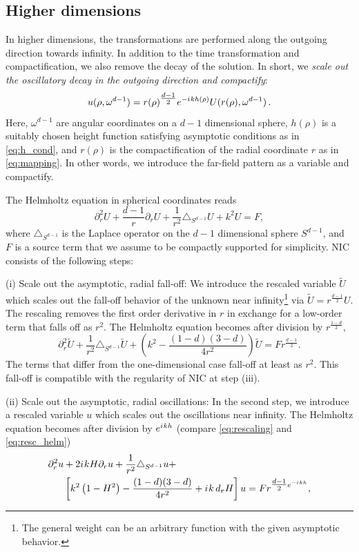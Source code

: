 \documentclass[onefignum,onetabnum]{siamart190516}
\newcommand{\be}{\begin{equation}}
\newcommand{\ee}{\end{equation}}
\newcommand{\iu}{{i\mkern1mu}}
\begin{document}
\subsection{Higher dimensions}\label{sec:high_d}
In higher dimensions, the transformations are performed along the outgoing direction towards infinity. In addition to the time transformation and compactification, we also remove the decay of the solution. In short, we \emph{scale out the oscillatory decay in the outgoing direction and compactify}:
\be\label{eq:summary} u(\rho, \omega^{d-1}) = r(\rho)^{\tfrac{d-1}{2}} e^{-\iu k h(\rho)} U(r(\rho), \omega^{d-1})\,.\ee
Here, $\omega^{d-1}$ are angular coordinates on a $d-1$ dimensional sphere, $h(\rho)$ is a suitably chosen height function satisfying asymptotic conditions as in \eqref{eq:h_cond}, and $r(\rho)$ is the compactification of the radial coordinate $r$ as in \eqref{eq:mapping}. In other words, we introduce the far-field pattern as a variable and compactify.

The Helmholtz equation in spherical coordinates reads
\begin{equation}\label{eq:helm_sph}
	\partial_r^2 U + \frac{d-1}{r} \partial_r U + \frac{1}{r^2}\triangle_{S^{d-1}} U + k^2 U = F,
\end{equation}
where $\triangle_{S^{d-1}}$ is the Laplace operator on the $d-1$ dimensional sphere $S^{d-1}$, and $F$ is a source term that we assume to be compactly supported for simplicity. NIC consists of the following steps:

\noindent (i) Scale out the asymptotic, radial fall-off: We introduce the rescaled variable $\tilde{U}$ which scales out the fall-off behavior of the unknown near infinity\footnote{The general weight can be an arbitrary function with the given asymptotic behavior.} via $\tilde{U} = r^{\tfrac{d-1}{2}} U$. The rescaling removes the first order derivative in $r$ in exchange for a low-order term that falls off as $r^2$. The Helmholtz equation becomes after division by $r^{\tfrac{1-d}{2}}$,
\[ \partial_r^2 \tilde{U} + \frac{1}{r^2}\triangle_{S^{d-1}} \tilde{U} + \left(k^2 - \frac{(1-d)(3-d)}{4 r^2} \right) \tilde{U} = F r^{\tfrac{d-1}{2}}. \]
The terms that differ from the one-dimensional case fall-off at least as $r^2$. This fall-off is compatible with the regularity of NIC at step (iii).

\noindent (ii) Scale out the asymptotic, radial oscillations: In the second step, we introduce a rescaled variable $u$ which scales out the oscillations near infinity. The Helmholtz equation becomes after division by $e^{\iu k h}$ (compare \eqref{eq:rescaling} and \eqref{eq:resc_helm})
\begin{align*}
	\partial_r^2 u & + 2 \iu k H \partial_r u + \frac{1}{r^2}\triangle_{S^{d-1}} u +                                        \\
	        & \left[k^2 \left(1- H^2\right) - \frac{(1-d)(3-d)}{4 r^2} + \iu k \, d_r H \right] u = F r^{\tfrac{d-1}{2} e^{-\iu k h}},
\end{align*}
\end{document}
